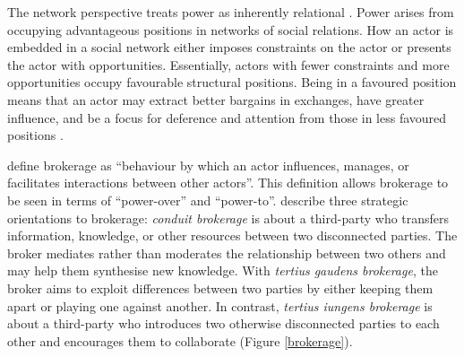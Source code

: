 {{The network perspective treats power as inherently relational \citep{ibarra1993network}. Power arises from occupying advantageous positions in networks of social relations. How an actor is embedded in a social network either imposes constraints on the actor or presents the actor with opportunities. Essentially, actors with fewer constraints and more opportunities occupy favourable structural positions. Being in a favoured position means that an actor may extract better bargains in exchanges, have greater influence, and be a focus for deference and attention from those in less favoured positions \citep{burt1992structural,hanneman2005introduction,simpson2011network}. \medskip

\citet{obstfeld2014brokerage} define brokerage as \enquote{behaviour by which an actor influences, manages, or facilitates interactions between other actors}. This definition allows brokerage to be seen in terms of \enquote{power-over} and \enquote{power-to}. \citet{obstfeld2014brokerage} describe three strategic orientations to brokerage: \emph{conduit brokerage} is about a third-party who transfers information, knowledge, or other resources between two disconnected parties. The broker mediates rather than moderates the relationship between two others and may help them synthesise new knowledge. With \emph{tertius gaudens brokerage}, the broker aims to exploit differences between two parties by either keeping them apart or playing one against another. In contrast, \emph{tertius iungens brokerage} is about a third-party who introduces two otherwise disconnected parties to each other and encourages them to collaborate (Figure \ref{brokerage}). \medskip 

}}
